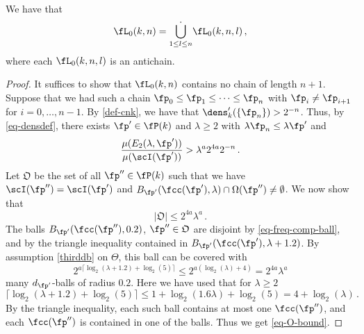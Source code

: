\begin{lemma}[L0 antichain]
\label{L0-antichain}
    We have that
    $$
        \fL_0(k,n) = \dot{\bigcup_{1 \le l \le n}} \fL_0(k,n,l)\,,
    $$
    where each $\fL_0(k,n,l)$ is an antichain.
\end{lemma}

\begin{proof}
    It suffices to show that $\fL_0(k,n)$ contains no chain of length $n + 1$. Suppose that we had such a chain $\fp_0 \le \fp_1 \le \dotsb \le \fp_{n}$ with $\fp_i \ne \fp_{i+1}$ for $i =0, \dotsc, n-1$. By \eqref{def-cnk}, we have that $\dens_k'(\{\fp_n\}) > 2^{-n}$. Thus, by \eqref{eq-densdef}, there exists $\fp' \in \fP(k)$ and $\lambda \ge 2$ with $\lambda \fp_n \le \lambda \fp'$ and
    \begin{equation}
        \label{eq-p'}
        \frac{\mu(E_2(\lambda, \fp'))}{\mu(\scI(\fp'))} > \lambda^{a} 2^{4a} 2^{-n}\,.
    \end{equation}
    Let $\mathfrak{O}$ be the set of all $\fp'' \in \fP(k)$ such that we have $ \scI(\fp'') = \scI(\fp')$ and $B_{\fp'}(\fcc(\fp'), \lambda) \cap \Omega(\fp'') \neq \emptyset$.
    We now show that
    \begin{equation}
        \label{eq-O-bound}
        |\mathfrak{O}| \le 2^{4a}\lambda^a\,.
    \end{equation}
    The balls $B_{\fp'}(\fcc(\fp''), 0.2)$, $\fp'' \in \mathfrak{O}$ are disjoint by \eqref{eq-freq-comp-ball},
    and by the triangle inequality contained in $B_{\fp'}(\fcc(\fp'), \lambda+1.2)$.
    By assumption \eqref{thirddb} on $\Theta$, this ball can be covered with
    $$
        2^{a\lceil \log_2(\lambda+1.2) + \log_2(5)\rceil} \le 2^{a(\log_2(\lambda) + 4)} = 2^{4a}\lambda^a
    $$
    many $d_{\fp'}$-balls of radius $0.2$. Here we have used that for $\lambda \ge 2$
    $$
        \lceil \log_2(\lambda + 1.2)  + \log_2(5) \rceil \le 1+ \log_2(1.6  \lambda) + \log_2(5) = 4 + \log_2(\lambda)\,.
    $$
    By the triangle inequality, each such ball contains at most one $\fcc(\fp'')$, and each $\fcc(\fp'')$ is contained in one of the balls. Thus we get \eqref{eq-O-bound}.


\end{proof}
